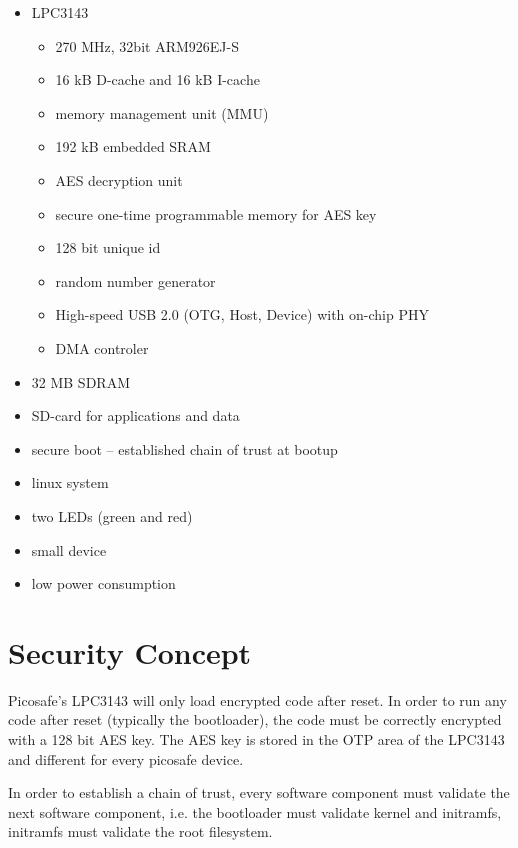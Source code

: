 \begin{itemize}
\item LPC3143
  \begin{itemize}
  \item 270 MHz, 32bit  ARM926EJ-S
  \item 16 kB D-cache and 16 kB I-cache
  \item memory management unit (MMU)
  \item 192 kB embedded SRAM
  \item AES decryption unit
  \item secure one-time programmable memory for AES key
  \item 128 bit unique id
  \item random number generator
  \item High-speed USB 2.0 (OTG, Host, Device) with on-chip PHY
  \item DMA controler
  \end{itemize}
\item 32 MB SDRAM
\item SD-card for applications and data
\item secure boot – established chain of trust at bootup
\item linux system
\item two LEDs (green and red)
\item small device
\item low power consumption
\end{itemize}

\section{Security Concept}

Picosafe's LPC3143 will only load encrypted code after reset. In order to run
any code after reset (typically the bootloader), the code must be correctly
encrypted with a 128 bit AES key. The AES key is stored in the OTP area of the
LPC3143 and different for every picosafe device.

In order to establish a chain of trust, every software component must validate
the next software component, i.e. the bootloader must validate kernel and
initramfs, initramfs must validate the root filesystem.


